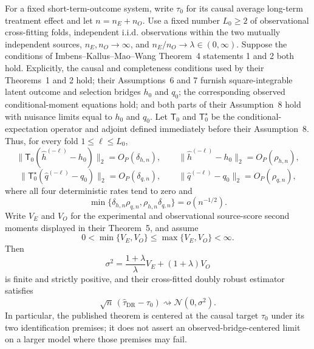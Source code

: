 For a fixed short-term-outcome system, write \(\tau_0\) for its causal average long-term treatment effect and let \(n=n_E+n_O\).  Use a fixed number \(L_0\ge2\) of observational cross-fitting folds, independent i.i.d. observations within the two mutually independent sources, \(n_E,n_O\to\infty\), and \(n_E/n_O\to\lambda\in(0,\infty)\).  Suppose the conditions of Imbens--Kallus--Mao--Wang Theorem~4 statements 1 and 2 both hold.  Explicitly, the causal and completeness conditions used by their Theorems~1 and 2 hold; their Assumptions~6 and 7 furnish square-integrable latent outcome and selection bridges \(h_0\) and \(q_0\); the corresponding observed conditional-moment equations hold; and both parts of their Assumption~8 hold with nuisance limits equal to \(h_0\) and \(q_0\).  Let \(\mathsf T_0\) and \(\mathsf T_0^\star\) be the conditional-expectation operator and adjoint defined immediately before their Assumption~8.  Thus, for every fold \(1\le\ell\le L_0\),
\[
 \|\mathsf T_0(\widehat h^{(-\ell)}-h_0)\|_2=O_P(\delta_{h,n}),
 \qquad
 \|\widehat h^{(-\ell)}-h_0\|_2=O_P(\rho_{h,n}),
\]
\[
 \|\mathsf T_0^\star(\widehat q^{(-\ell)}-q_0)\|_2=O_P(\delta_{q,n}),
 \qquad
 \|\widehat q^{(-\ell)}-q_0\|_2=O_P(\rho_{q,n}),
\]
where all four deterministic rates tend to zero and
\[
 \min\{\delta_{h,n}\rho_{q,n},\rho_{h,n}\delta_{q,n}\}
 =o(n^{-1/2}).
\]
Write \(V_E\) and \(V_O\) for the experimental and observational source-score second moments displayed in their Theorem~5, and assume
\[
 0<\min\{V_E,V_O\}\le\max\{V_E,V_O\}<\infty.
\]
Then
\[
 \sigma^2=\frac{1+\lambda}{\lambda}V_E+(1+\lambda)V_O
\]
is finite and strictly positive, and their cross-fitted doubly robust estimator satisfies
\[
 \sqrt n\,(\widehat\tau_{\mathrm{DR}}-\tau_0)
 \rightsquigarrow\mathcal N(0,\sigma^2).
\]
In particular, the published theorem is centered at the causal target \(\tau_0\) under its two identification premises; it does not assert an observed-bridge-centered limit on a larger model where those premises may fail.